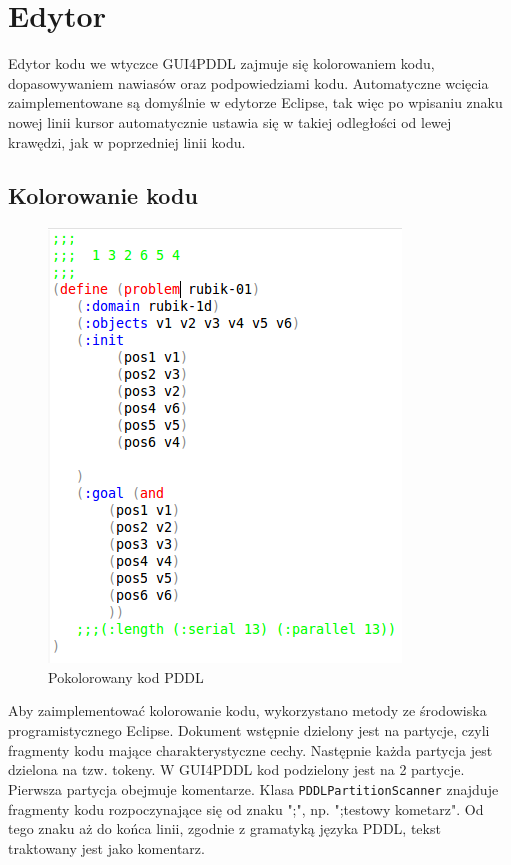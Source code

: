 \section{Edytor}
Edytor kodu we wtyczce GUI4PDDL zajmuje się kolorowaniem kodu, dopasowywaniem nawiasów oraz podpowiedziami kodu. Automatyczne wcięcia zaimplementowane są domyślnie w edytorze Eclipse, tak więc po wpisaniu znaku nowej linii kursor automatycznie ustawia się w takiej odległości od lewej krawędzi, jak w poprzedniej linii kodu.
\subsection{Kolorowanie kodu}
\begin{figure}[h]
  \centering
    \includegraphics{img/colored-code.png}
    \caption{Pokolorowany kod PDDL}
    \label{ana_structure}
\end{figure}
Aby zaimplementować kolorowanie kodu, wykorzystano metody ze środowiska programistycznego Eclipse. Dokument wstępnie dzielony jest na partycje, czyli fragmenty kodu mające charakterystyczne cechy. Następnie każda partycja jest dzielona na tzw. tokeny. W GUI4PDDL kod podzielony jest na 2 partycje. Pierwsza partycja obejmuje komentarze. Klasa \texttt{PDDLPartitionScanner} znajduje fragmenty kodu rozpoczynające się od znaku ";", np.  ";testowy kometarz". Od tego znaku aż do końca linii, zgodnie z gramatyką języka PDDL, tekst traktowany jest jako komentarz.
